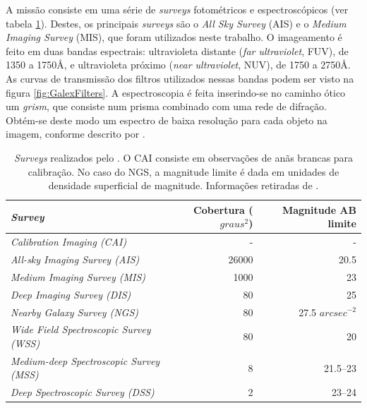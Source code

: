 A missão consiste em uma série de {\em surveys} fotométricos e espectroscópicos
(ver tabela \ref{tab:GalexSurveys}). Destes, os principais {\em surveys} são o
{\em All Sky Survey} (AIS) e o {\em Medium Imaging Survey} (MIS), que foram
utilizados neste trabalho. O imageamento é feito em duas bandas espectrais:
ultravioleta distante ({\em far ultraviolet}, FUV), de 1350 a 1750\AA, e
ultravioleta próximo ({\em near ultraviolet}, NUV), de 1750 a 2750\AA. As curvas
de transmissão dos filtros utilizados nessas bandas podem ser visto na figura
\ref{fig:GalexFilters}. A espectroscopia é feita inserindo-se no caminho ótico
um {\em grism}, que consiste num prisma combinado com uma rede de difração.
Obtém-se deste modo um espectro de baixa resolução para cada objeto na imagem,
conforme descrito por \cite{Morrissey2007}.

\begin{table}
	\caption[{\em Surveys} realizados pelo \galex.]{{\em Surveys} realizados pelo
	\galex. O CAI consiste em observações de anãs brancas para calibração. No caso
	do NGS, a magnitude limite é dada em unidades de densidade superficial de
	magnitude. Informações retiradas de \cite{Martin2005}.}
	\begin{tabular}{l r r}
		{\em Survey} & Cobertura ($graus^2$) & Magnitude AB limite \\ 
		\midrule
		{\em Calibration Imaging (CAI)} & - & - \\
		{\em All-sky Imaging Survey (AIS)} & 26000 & 20.5 \\
		{\em Medium Imaging Survey (MIS)} & 1000 & 23 \\
		{\em Deep Imaging Survey (DIS)} & 80 & 25 \\
		{\em Nearby Galaxy Survey (NGS)} & 80 & 27.5 $arcsec^{-2}$  \\
		{\em Wide Field Spectroscopic Survey (WSS)} & 80 & 20 \\
		{\em Medium-deep Spectroscopic Survey (MSS)} & 8 & 21.5--23 \\
		{\em Deep Spectroscopic Survey (DSS)} & 2 & 23--24 \\
	\end{tabular}
	\label{tab:GalexSurveys}
\end{table}

